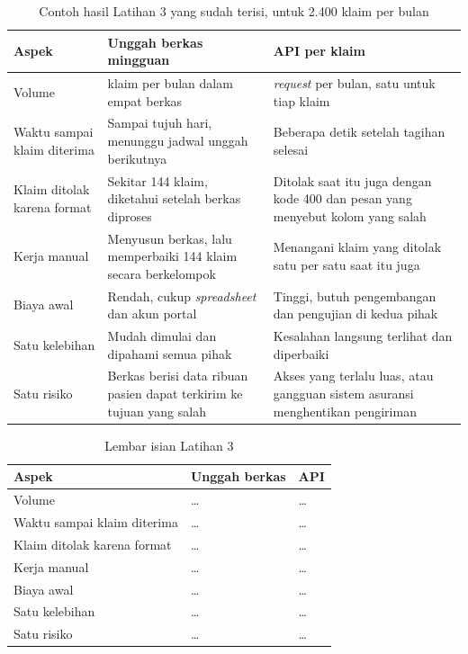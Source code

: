 \begin{table}[!htb]
  \centering
  \caption{Contoh hasil Latihan 3 yang sudah terisi, untuk 2.400 klaim per bulan}
  \label{tab:ch01-lat3-contoh}
  \begin{tabularx}{\textwidth}{>{\raggedright\arraybackslash}p{2.6cm}
                               >{\raggedright\arraybackslash}X
                               >{\raggedright\arraybackslash}X}
    \hline
    \textbf{Aspek} & \textbf{Unggah berkas mingguan} & \textbf{API per klaim} \\
    \hline
    Volume & 2.400 klaim per bulan dalam empat berkas & 2.400 \textit{request} per bulan, satu untuk tiap klaim \\
    \hline
    Waktu sampai klaim diterima & Sampai tujuh hari, menunggu jadwal unggah berikutnya & Beberapa detik setelah tagihan selesai \\
    \hline
    Klaim ditolak karena format & Sekitar 144 klaim, diketahui setelah berkas diproses & Ditolak saat itu juga dengan kode 400 dan pesan yang menyebut kolom yang salah \\
    \hline
    Kerja manual & Menyusun berkas, lalu memperbaiki 144 klaim secara berkelompok & Menangani klaim yang ditolak satu per satu saat itu juga \\
    \hline
    Biaya awal & Rendah, cukup \textit{spreadsheet} dan akun portal & Tinggi, butuh pengembangan dan pengujian di kedua pihak \\
    \hline
    Satu kelebihan & Mudah dimulai dan dipahami semua pihak & Kesalahan langsung terlihat dan diperbaiki \\
    \hline
    Satu risiko & Berkas berisi data ribuan pasien dapat terkirim ke tujuan yang salah & Akses yang terlalu luas, atau gangguan sistem asuransi menghentikan pengiriman \\
    \hline
  \end{tabularx}
\end{table}

\begin{table}[!htb]
  \centering
  \caption{Lembar isian Latihan 3}
  \label{tab:ch01-lat3-hasil}
  \begin{tabularx}{\textwidth}{>{\raggedright\arraybackslash}p{2.6cm}
                               >{\raggedright\arraybackslash}X
                               >{\raggedright\arraybackslash}X}
    \hline
    \textbf{Aspek} & \textbf{Unggah berkas} & \textbf{API} \\
    \hline
    Volume & \dots & \dots \\
    \hline
    Waktu sampai klaim diterima & \dots & \dots \\
    \hline
    Klaim ditolak karena format & \dots & \dots \\
    \hline
    Kerja manual & \dots & \dots \\
    \hline
    Biaya awal & \dots & \dots \\
    \hline
    Satu kelebihan & \dots & \dots \\
    \hline
    Satu risiko & \dots & \dots \\
    \hline
  \end{tabularx}
\end{table}
